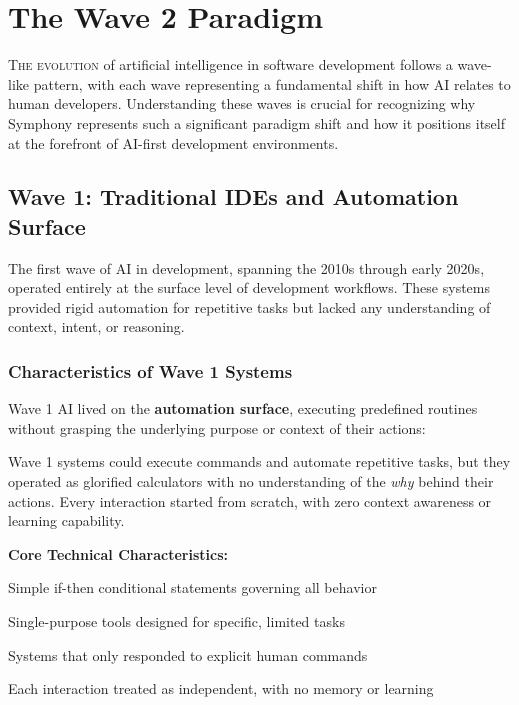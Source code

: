 
\section{The Wave 2 Paradigm}
\label{sec:wave2-paradigm}

\lettrine{T}{he evolution} of artificial intelligence in software development follows a wave-like pattern, with each wave representing a fundamental shift in how AI relates to human developers. Understanding these waves is crucial for recognizing why Symphony represents such a significant paradigm shift and how it positions itself at the forefront of AI-first development environments.

\subsection{Wave 1: Traditional IDEs and Automation Surface}
\label{subsec:wave1-traditional}

The first wave of AI in development, spanning the 2010s through early 2020s, operated entirely at the surface level of development workflows. These systems provided rigid automation for repetitive tasks but lacked any understanding of context, intent, or reasoning.

\subsubsection{Characteristics of Wave 1 Systems}

Wave 1 AI lived on the \textbf{automation surface}, executing predefined routines without grasping the underlying purpose or context of their actions:

\begin{infobox}[title=Wave 1: The Automation Era]
Wave 1 systems could execute commands and automate repetitive tasks, but they operated as glorified calculators with no understanding of the \textit{why} behind their actions. Every interaction started from scratch, with zero context awareness or learning capability.
\end{infobox}

\textbf{Core Technical Characteristics:}

\begin{description}[leftmargin=3.5cm,labelwidth=3cm]
    \item[\textbf{Rule-Based Logic}] Simple if-then conditional statements governing all behavior
    
    \item[\textbf{Narrow Scope}] Single-purpose tools designed for specific, limited tasks
    
    \item[\textbf{Reactive Behavior}] Systems that only responded to explicit human commands
    
    \item[\textbf{Zero Context}] Each interaction treated as independent, with no memory or learning
\end{description}

